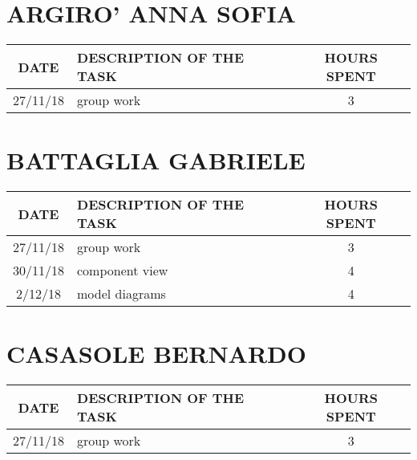 \section{ARGIRO' ANNA SOFIA}
\begin{table}[h!]
\begin{tabular}{|c|p{3in}|c|}
\hline
\textbf{DATE} &\textbf{DESCRIPTION OF THE TASK} & \textbf{HOURS SPENT}\\
\hline
27/11/18 & group work & 3\\
\hline
\end{tabular}
\end{table}

\clearpage


\section{BATTAGLIA GABRIELE}
\begin{table}[h!]
	\begin{tabular}{|c|p{3in}|c|}
\hline
\textbf{DATE} &\textbf{DESCRIPTION OF THE TASK} & \textbf{HOURS SPENT}\\
\hline
27/11/18 & group work & 3\\
\hline
30/11/18 & component view & 4\\
\hline
2/12/18 & model diagrams & 4\\
\hline
	\end{tabular}
\end{table}

\clearpage

\section{CASASOLE BERNARDO}
\begin{table}[h!]
	\begin{tabular}{|c|p{3in}|c|}
\hline
\textbf{DATE} &\textbf{DESCRIPTION OF THE TASK} & \textbf{HOURS SPENT}\\
\hline
27/11/18 & group work & 3\\
\hline
	\end{tabular}
\end{table}